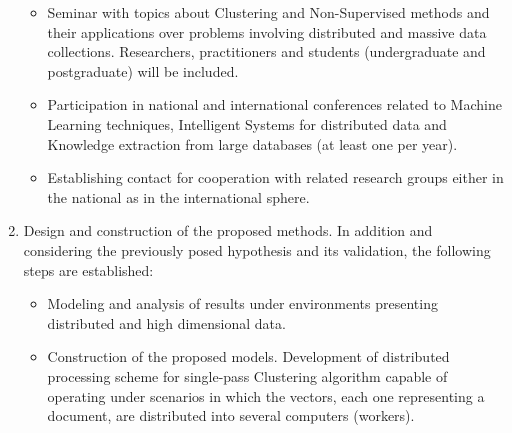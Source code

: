 \documentclass[10pt]{article}
\begin{document}
\begin{enumerate}
\begin{itemize}
            \item Seminar with topics about Clustering and Non-Supervised methods and their applications over problems involving  distributed and massive data collections. Researchers, practitioners and students (undergraduate and postgraduate) will be included. 
            \item Participation in national and international conferences related to Machine Learning techniques, Intelligent Systems for distributed data and Knowledge extraction from large databases (at least one per year).
            \item Establishing contact for cooperation with related research groups either in the national as in the international sphere.
        \end{itemize}
    \item Design and construction of the proposed methods. In addition and considering the previously posed hypothesis and its validation, the following steps are established:
\begin{itemize}
\item Modeling and analysis of results under environments presenting distributed and high dimensional data.

\item Construction of the proposed models. Development of distributed processing scheme for single-pass Clustering algorithm capable of operating under scenarios in which the vectors, each one representing a document, are distributed into several computers (workers).


\end{itemize}
\end{enumerate}
\end{document}
